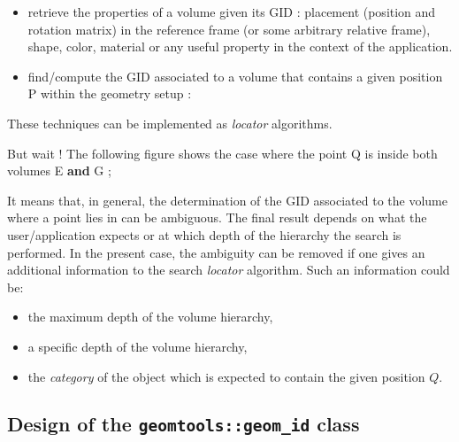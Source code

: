 \begin{itemize}

\item retrieve  the properties of a  volume given its  GID : placement
  (position  and rotation  matrix)  in the  reference  frame (or  some
  arbitrary  relative frame),  shape,  color, material  or any  useful
  property in the context of the application.
\begin{center}
\scalebox{1.0}{}
\end{center}

\item  find/compute the  GID associated  to a  volume that  contains a
  given position P within the geometry setup :
\begin{center}
\scalebox{1.0}{}
\end{center}

\end{itemize}

\pn These techniques can be implemented as \emph{locator} algorithms.

\pn But wait ! The following figure shows the case where the point Q
is inside both volumes E \textbf{and} G ;
\begin{center}
\scalebox{1.0}{}
\end{center}

\pn It means that, in general,  the determination of the GID associated to
the volume  where a point lies  in can be ambiguous.  The final result
depends on what the user/application expects or at which depth of the
hierarchy the search is performed. In the present case, the ambiguity 
can be removed if one gives an additional information to the search
\emph{locator} algorithm. Such an information could be:
\begin{itemize}
\item the maximum depth of the volume hierarchy,
\item a specific depth of the volume hierarchy,
\item the \emph{category} of the object which is expected to 
  contain the given position $Q$.
\end{itemize}

\subsection{Design of the \texttt{geomtools::geom\_id} class}
 

